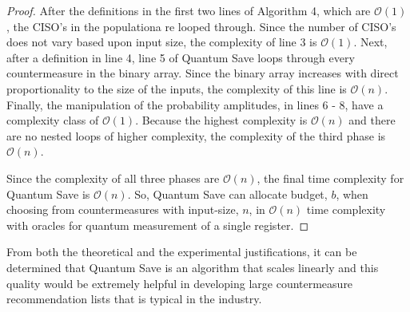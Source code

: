 \begin{proof}
\vspace{1mm}

After the definitions in the first two lines of Algorithm 4, which are $\mathcal{O}(1)$, the CISO's in the populationa re looped through. Since the number of CISO's does not vary based upon input size, the complexity of line 3 is $\mathcal{O}(1)$. Next, after a definition in line 4, line 5 of Quantum Save loops through every countermeasure in the binary array. Since the binary array increases with direct proportionality to the size of the inputs, the complexity of this line is $\mathcal{O}(n)$. Finally, the manipulation of the probability amplitudes, in lines 6 - 8, have a complexity class of $\mathcal{O}(1)$. Because the highest complexity is $\mathcal{O}(n)$ and there are no nested loops of higher complexity, the complexity of the third phase is $\mathcal{O}(n)$.

\vspace{1mm}

Since the complexity of all three phases are $\mathcal{O}(n)$, the final time complexity for Quantum Save is $\mathcal{O}(n)$. So, Quantum Save can allocate budget, $b$, when choosing from countermeasures with input-size, $n$, in $\mathcal{O}(n)$ time complexity with oracles for quantum measurement of a single register.
\end{proof}

From both the theoretical and the experimental justifications, it can be determined that Quantum Save is an algorithm that scales linearly and this quality would be extremely helpful in developing large countermeasure recommendation lists that is typical in the industry.

